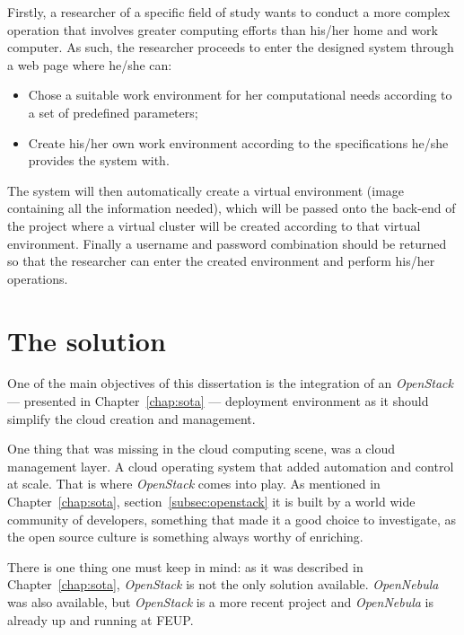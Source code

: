Firstly, a researcher of a specific field of study wants to conduct a more complex operation that involves greater computing efforts than his/her home and work computer. As such, the researcher proceeds to enter the designed system through a web page where he/she can:

\begin{itemize}
	\item Chose a suitable work environment for her computational needs according to a set of predefined parameters;
	\item Create his/her own work environment according to the specifications he/she provides the system with.
\end{itemize}

The system will then automatically create a virtual environment (image containing all the information needed), which will be passed onto the back-end of the project where a virtual cluster will be created according to that virtual environment.
Finally a username and password combination should be returned so that the researcher can enter the created environment and perform his/her operations. 

\section{The solution}\label{sec:solution}

One of the main objectives of this dissertation is the integration of an \textit{OpenStack} --- presented in Chapter~\ref{chap:sota} --- deployment environment as it should simplify the cloud creation and management.

One thing that was missing in the cloud computing scene, was a cloud management layer. A cloud operating system that added automation and control at scale. That is where \textit{OpenStack} comes into play. As mentioned in Chapter~\ref{chap:sota}, section~\ref{subsec:openstack} it is built by a world wide community of developers, something that made it a good choice to investigate, as the open source culture is something always worthy of enriching.~\cite{https://github.com/dellcloudedge/crowbar/wiki/OpenStack-Essex-Deploy-Day}

There is one thing one must keep in mind: as it was described in Chapter~\ref{chap:sota}, \textit{OpenStack} is not the only solution available. \textit{OpenNebula} was also available, but \textit{OpenStack} is a more recent project and \textit{OpenNebula} is already up and running at FEUP. 

